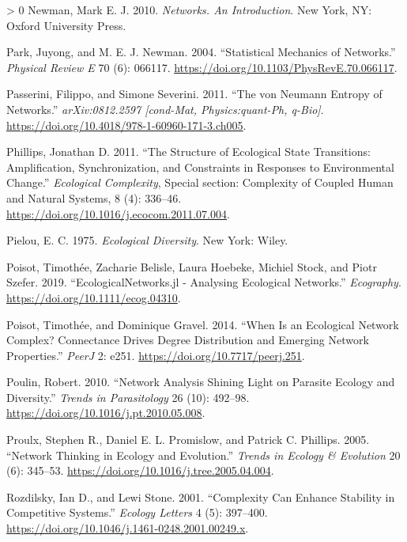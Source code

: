 \documentclass[11pt]{article}
\newlength{\cslhangindent}
\newenvironment{CSLReferences}[3] %
 {%
  \setlength{\parindent}{0pt}
  \ifodd #1 \everypar{\setlength{\hangindent}{\cslhangindent}}\ignorespaces\fi
  \ifnum #2 > 0
  \setlength{\parskip}{#2\baselineskip}
  \fi
 }%
 {}
\begin{document}
\begin{CSLReferences}{1}{0}
\leavevmode\hypertarget{ref-Newman2010NetInt}{}%
Newman, Mark E. J. 2010. \emph{Networks. An Introduction}. New York, NY:
Oxford University Press.

\leavevmode\hypertarget{ref-Park2004StaMec}{}%
Park, Juyong, and M. E. J. Newman. 2004. {``Statistical Mechanics of
Networks.''} \emph{Physical Review E} 70 (6): 066117.
\url{https://doi.org/10.1103/PhysRevE.70.066117}.

\leavevmode\hypertarget{ref-Passerini2011NeuEnt}{}%
Passerini, Filippo, and Simone Severini. 2011. {``The von Neumann
Entropy of Networks.''} \emph{arXiv:0812.2597 {[}cond-Mat,
Physics:quant-Ph, q-Bio{]}}.
\url{https://doi.org/10.4018/978-1-60960-171-3.ch005}.

\leavevmode\hypertarget{ref-Phillips2011StrEco}{}%
Phillips, Jonathan D. 2011. {``The Structure of Ecological State
Transitions: Amplification, Synchronization, and Constraints in
Responses to Environmental Change.''} \emph{Ecological Complexity},
Special section: Complexity of Coupled Human and Natural Systems, 8 (4):
336--46. \url{https://doi.org/10.1016/j.ecocom.2011.07.004}.

\leavevmode\hypertarget{ref-Pielou1975EcoDiv}{}%
Pielou, E. C. 1975. \emph{Ecological Diversity}. New York: Wiley.

\leavevmode\hypertarget{ref-Poisot2019EcoJl}{}%
Poisot, Timothée, Zacharie Belisle, Laura Hoebeke, Michiel Stock, and
Piotr Szefer. 2019. {``EcologicalNetworks.jl - Analysing Ecological
Networks.''} \emph{Ecography}. \url{https://doi.org/10.1111/ecog.04310}.

\leavevmode\hypertarget{ref-Poisot2014WheEco}{}%
Poisot, Timothée, and Dominique Gravel. 2014. {``When Is an Ecological
Network Complex? Connectance Drives Degree Distribution and Emerging
Network Properties.''} \emph{PeerJ} 2: e251.
\url{https://doi.org/10.7717/peerj.251}.

\leavevmode\hypertarget{ref-Poulin2010NetAna}{}%
Poulin, Robert. 2010. {``Network Analysis Shining Light on Parasite
Ecology and Diversity.''} \emph{Trends in Parasitology} 26 (10):
492--98. \url{https://doi.org/10.1016/j.pt.2010.05.008}.

\leavevmode\hypertarget{ref-Proulx2005NetThi}{}%
Proulx, Stephen R., Daniel E. L. Promislow, and Patrick C. Phillips.
2005. {``Network Thinking in Ecology and Evolution.''} \emph{Trends in
Ecology \& Evolution} 20 (6): 345--53.
\url{https://doi.org/10.1016/j.tree.2005.04.004}.

\leavevmode\hypertarget{ref-Rozdilsky2001ComCan}{}%
Rozdilsky, Ian D., and Lewi Stone. 2001. {``Complexity Can Enhance
Stability in Competitive Systems.''} \emph{Ecology Letters} 4 (5):
397--400. \url{https://doi.org/10.1046/j.1461-0248.2001.00249.x}.


\end{CSLReferences}
\end{document}
